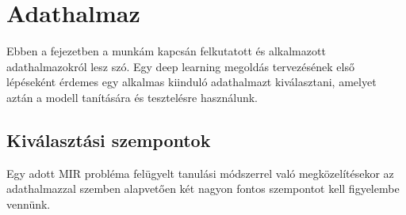 \chapter{Adathalmaz}
\label{ch:dataset}

Ebben a fejezetben a munkám kapcsán felkutatott és alkalmazott adathalmazokról lesz szó. Egy deep learning megoldás tervezésének első lépéseként érdemes egy alkalmas kiinduló adathalmazt kiválasztani, amelyet aztán a modell tanítására és tesztelésre használunk.

\section{Kiválasztási szempontok}

Egy adott MIR probléma felügyelt tanulási módszerrel való megközelítésekor az adathalmazzal szemben alapvetően két nagyon fontos szempontot kell figyelembe vennünk.
